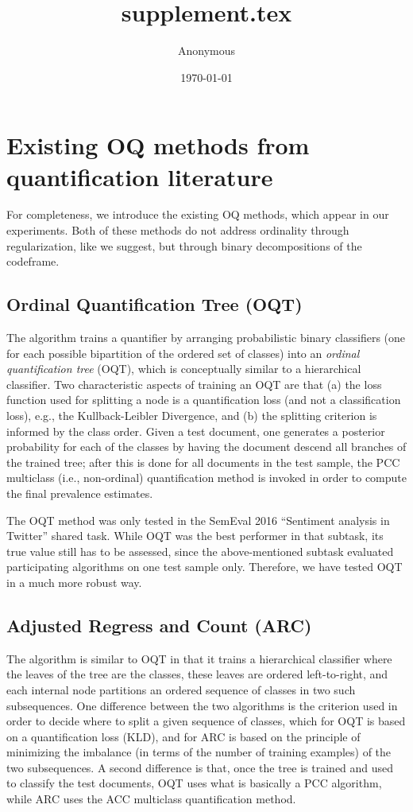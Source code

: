 \documentclass[10pt,a4paper]{article}
\title{supplement.tex}
\author{Anonymous}
\date{\today}
\begin{document}
\section{Existing OQ methods from quantification literature}
\label{sec:existingmethods}

For completeness, we introduce the existing OQ methods, which appear in our experiments. Both of these methods do not address ordinality through regularization, like we suggest, but through binary decompositions of the codeframe.

\subsection{Ordinal Quantification Tree (OQT)}
\label{sec:OQT}

\noindent The algorithm trains a
quantifier by arranging probabilistic binary classifiers (one for each
possible bipartition of the ordered set of classes) into an
\emph{ordinal quantification tree} (OQT), which is conceptually
similar to a hierarchical classifier. Two characteristic aspects of
training an OQT are that (a) the loss function used for splitting a
node is a quantification loss (and not a classification loss), e.g.,
the Kullback-Leibler Divergence, and (b) the splitting criterion is
informed by the class order. Given a test document, one generates a
posterior probability for each of the classes by having the document
descend all branches of the trained tree; after this is done for all
documents in the test sample, the PCC multiclass (i.e., non-ordinal)
quantification method is invoked in order to compute the final
prevalence estimates.

The OQT method was only tested in the SemEval 2016 ``Sentiment
analysis in Twitter'' shared task.  While OQT was
the best performer in that subtask, its true value still has to be
assessed, since the above-mentioned subtask evaluated participating
algorithms on one test sample only. Therefore, we
have tested OQT in a much more robust way.

\subsection{Adjusted Regress and Count (ARC)}
\label{sec:ARC}

\noindent The algorithm is similar to OQT in that it trains a hierarchical classifier where the leaves of the tree are the classes, these leaves are ordered left-to-right, and each internal node partitions an ordered sequence of classes in two such subsequences. One difference between the two algorithms is the criterion used in order to decide where to split a given sequence of classes, which for OQT is based on a quantification loss (KLD), and for ARC is based on the principle of minimizing the imbalance (in terms of the number of training examples) of the two subsequences. A second difference is that, once the tree is trained and used to classify the test documents, OQT uses what is basically a PCC algorithm, while ARC uses the ACC multiclass quantification method.
\end{document}
